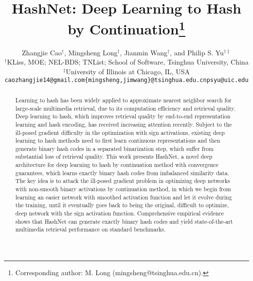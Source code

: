 \documentclass[10pt,twocolumn,letterpaper]{article}
\begin{document}
\title{HashNet: Deep Learning to Hash by Continuation\thanks{Corresponding author: M. Long (mingsheng@tsinghua.edu.cn).}}

\author{
    Zhangjie Cao$^\dag$, Mingsheng Long$^\dag$, Jianmin Wang$^\dag$, and Philip S. Yu$^{\dag\ddag}$\\
    $^\dag$KLiss, MOE; NEL-BDS; TNList; School of Software, Tsinghua University, China\\
    $^\ddag$University of Illinois at Chicago, IL, USA\\
    {\tt\small caozhangjie14@gmail.com\quad \{mingsheng,jimwang\}@tsinghua.edu.cn\quad psyu@uic.edu}
}

\maketitle

\begin{abstract}
Learning to hash has been widely applied to approximate nearest neighbor search for large-scale multimedia retrieval, due to its computation efficiency and retrieval quality. Deep learning to hash, which improves retrieval quality by end-to-end representation learning and hash encoding, has received increasing attention recently. Subject to the ill-posed gradient difficulty in the optimization with sign activations, existing deep learning to hash methods need to first learn continuous representations and then generate binary hash codes in a separated binarization step, which suffer from substantial loss of retrieval quality. This work presents HashNet, a novel deep architecture for deep learning to hash by continuation method with convergence guarantees, which learns exactly binary hash codes from imbalanced similarity data. The key idea is to attack the ill-posed gradient problem in optimizing deep networks with non-smooth binary activations by continuation method, in which we begin from learning an easier network with smoothed activation function and let it evolve during the training, until it eventually goes back to being the original, difficult to optimize, deep network with the sign activation function. Comprehensive empirical evidence shows that HashNet can generate exactly binary hash codes and yield state-of-the-art multimedia retrieval performance on standard benchmarks.
\end{abstract}

\vspace{-20pt}
\end{document}
